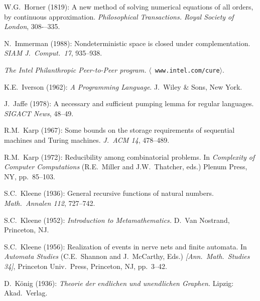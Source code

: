 \begin{thebibliography}{999}


W.G.~Horner (1819): 
A new method of solving numerical equations of all orders, by
continuous approximation. {\it Philosophical Transactions. Royal
Society of London}, 308-–335.


N.~Immerman (1988): Nondeterministic space is closed under
complementation.  {\it SIAM J.~Comput.~17}, 935--938.

{\it The Intel Philanthropic Peer-to-Peer program.}  $\langle${\tt
www.intel.com/cure}$\rangle$.

K.E.~Iverson (1962):
{\it A Programming Language}.
J.~Wiley \& Sons, New York.


J.~Jaffe (1978): A necessary and sufficient pumping lemma for regular
languages.  {\it SIGACT News}, 48--49.


R.M.~Karp (1967): Some bounds on the storage requirements of
sequential machines and Turing machines.  {\it J.~ACM 14}, 478--489.

R.M.~Karp (1972): Reducibility among combinatorial problems.  In {\it
Complexity of Computer Computations} (R.E.~Miller and J.W.~Thatcher,
eds.)  Plenum Press, NY, pp.~85--103.

S.C.~Kleene (1936): General recursive functions of natural numbers.
{\it Math.~Annalen 112}, 727--742.

S.C.~Kleene (1952):
{\it Introduction to Metamathematics.}
D.~Van Nostrand, Princeton, NJ.

S.C.~Kleene (1956): Realization of events in nerve nets and finite
automata.  In {\it Automata Studies} (C.E.~Shannon and J.~McCarthy,
Eds.) {\it [Ann.~Math.~Studies 34]}, Princeton Univ.~Press, Princeton,
NJ, pp.~3--42.

D.~K\"onig (1936):
{\it Theorie der endlichen und unendlichen Graphen.}  Lipzig: Akad.~Verlag.


\end{thebibliography}
